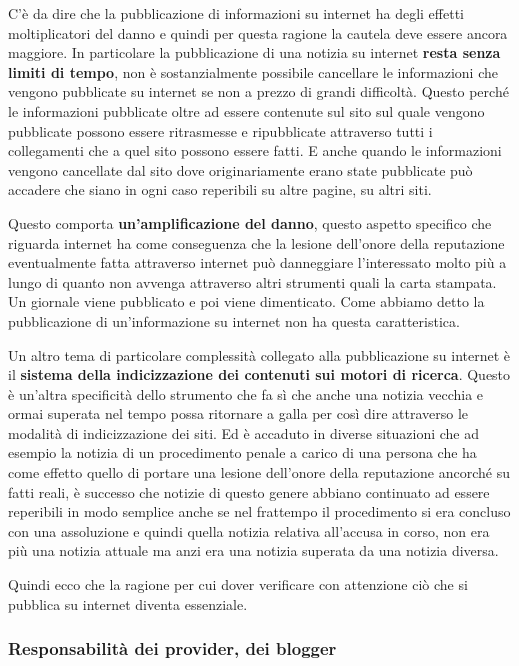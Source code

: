 C'è da dire che la pubblicazione di informazioni su internet ha degli effetti moltiplicatori del danno e quindi per questa ragione la cautela deve essere ancora maggiore. In particolare la pubblicazione di una notizia su internet \textbf{resta senza limiti di tempo}, non è sostanzialmente possibile cancellare le informazioni che vengono pubblicate su internet se non a prezzo di grandi difficoltà. Questo perché le informazioni pubblicate oltre ad essere contenute sul sito sul quale vengono pubblicate possono essere ritrasmesse e ripubblicate attraverso tutti i collegamenti che a quel sito possono essere fatti. E anche quando le informazioni vengono cancellate dal sito dove originariamente erano state pubblicate può accadere che siano in ogni caso reperibili su altre pagine, su altri siti.

Questo comporta \textbf{un'amplificazione del danno}, questo aspetto specifico che riguarda internet ha come conseguenza che la lesione dell'onore della reputazione eventualmente fatta attraverso internet può danneggiare l'interessato molto più a lungo di quanto non avvenga attraverso altri strumenti quali la carta stampata.
Un giornale viene pubblicato e poi viene dimenticato. Come abbiamo detto la pubblicazione di un'informazione su internet non ha questa caratteristica.

Un altro tema di particolare complessità collegato alla pubblicazione su internet è il \textbf{sistema della indicizzazione dei contenuti sui motori di ricerca}. Questo è un'altra specificità dello strumento che fa sì che anche una notizia vecchia e ormai superata nel tempo possa ritornare a galla per così dire attraverso le modalità di indicizzazione dei siti. Ed è accaduto in diverse situazioni che ad esempio la notizia di un procedimento penale a carico di una persona che ha come effetto quello di portare una lesione dell'onore della reputazione ancorché su fatti reali, è successo che notizie di questo genere abbiano continuato ad essere reperibili in modo semplice anche se nel frattempo il procedimento si era concluso con una assoluzione e quindi quella notizia relativa all'accusa in corso, non era più una notizia attuale ma anzi era una notizia superata da una notizia diversa.

Quindi ecco che la ragione per cui dover verificare con attenzione ciò che si pubblica su internet diventa essenziale.

\subsubsection{Responsabilità dei provider, dei blogger}

